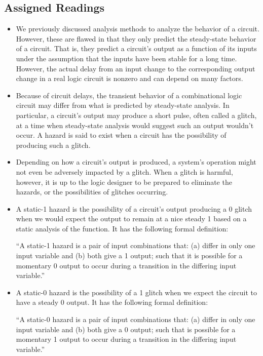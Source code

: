 \documentclass[10pt,a4paper]{article}
\begin{document}
\subsection{Assigned Readings}
\begin{itemize}
\item We previously discussed analysis methods to analyze the behavior of a circuit. However, these are flawed in that they only predict the steady-state behavior of a circuit. That is,  they predict a circuit's output as a function of its inputs under the assumption that the inputs have been stable for a long time. However, the actual delay from an input change to the corresponding output change in a real logic circuit is nonzero and can depend on many factors.
\item Because of circuit delays, the transient behavior of a combinational logic circuit may differ from what is predicted by steady-state analysis. In particular, a circuit's output may produce a short pulse, often called a glitch, at a time when steady-state analysis would suggest such an output wouldn't occur. A hazard is said to exist when a circuit has the possibility of producing such a glitch. 
\item Depending on how a circuit's output is produced, a system's operation might not even be adversely impacted by a glitch. When a glitch is harmful, however, it is up to the logic designer to be prepared to eliminate the hazards, or the possibilities of glitches occurring. 
\pagebreak
\item A static-1 hazard is the possibility of a circuit's output producing a 0 glitch when we would expect the output to remain at a nice steady 1 based on a static analysis of the function. It has the following formal definition:
\begin{displayquote}
``A static-1 hazard is a pair of input combinations that: (a) differ in only one input variable and (b) both give a 1 output; such that it is possible for a momentary 0 output to occur during a transition in the differing input variable.''
\end{displayquote}
\item A static-0 hazard is the possibility of a 1 glitch when we expect the circuit to have a steady 0 output. It has the following formal definition:
\begin{displayquote}
``A static-0 hazard is a pair of input combinations that: (a) differ in only one input variable and (b) both give a 0 output; such that is possible for a momentary 1 output to occur during a transition in the differing input variable.''

\end{displayquote}
\end{itemize}
\end{document}
